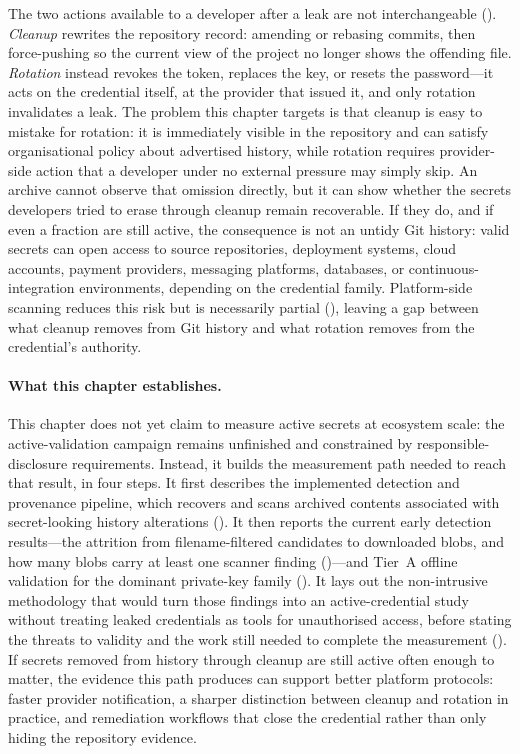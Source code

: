 The two actions available to a developer after a leak are not interchangeable ().
\emph{Cleanup} rewrites the repository record: amending or rebasing commits, then force-pushing so the current view of the project no longer shows the offending file.
\emph{Rotation} instead revokes the token, replaces the key, or resets the password---it acts on the credential itself, at the provider that issued it, and only rotation invalidates a leak.
The problem this chapter targets is that cleanup is easy to mistake for rotation: it is immediately visible in the repository and can satisfy organisational policy about advertised history, while rotation requires provider-side action that a developer under no external pressure may simply skip.
An archive cannot observe that omission directly, but it can show whether the secrets developers tried to erase through cleanup remain recoverable.
If they do, and if even a fraction are still active, the consequence is not an untidy Git history: valid secrets can open access to source repositories, deployment systems, cloud accounts, payment providers, messaging platforms, databases, or continuous-integration environments, depending on the credential family.
Platform-side scanning reduces this risk but is necessarily partial (), leaving a gap between what cleanup removes from Git history and what rotation removes from the credential's authority.

\paragraph{What this chapter establishes.}
This chapter does not yet claim to measure active secrets at ecosystem scale: the active-validation campaign remains unfinished and constrained by responsible-disclosure requirements.
Instead, it builds the measurement path needed to reach that result, in four steps.
It first describes the implemented detection and provenance pipeline, which recovers and scans archived contents associated with secret-looking history alterations ().
It then reports the current early detection results---the attrition from filename-filtered candidates to downloaded blobs, and how many blobs carry at least one scanner finding ()---and Tier~A offline validation for the dominant private-key family ().
It lays out the non-intrusive methodology that would turn those findings into an active-credential study without treating leaked credentials as tools for unauthorised access, before stating the threats to validity and the work still needed to complete the measurement ().
If secrets removed from history through cleanup are still active often enough to matter, the evidence this path produces can support better platform protocols: faster provider notification, a sharper distinction between cleanup and rotation in practice, and remediation workflows that close the credential rather than only hiding the repository evidence.

